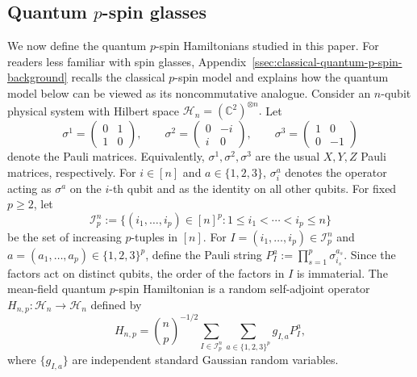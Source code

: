 \documentclass[12pt]{article}
\newcommand{\C}{\mathbb{C}}
\newcommand{\mcH}{\mathcal{H}}
\newcommand{\mcI}{\mathcal{I}}
\begin{document}
\subsection{Quantum $p$-spin glasses}
We now define the quantum \(p\)-spin Hamiltonians studied in this paper. For readers less familiar with spin glasses, Appendix~\ref{ssec:classical-quantum-p-spin-background}
recalls the classical \(p\)-spin model and explains how the quantum model below can be viewed as its noncommutative analogue.
Consider an \(n\)-qubit physical system with Hilbert space 
$\mcH_n=(\C^2)^{\otimes n}.$ Let
\[
    \sigma^1
    =
    \begin{pmatrix}
        0&1\\
        1&0
    \end{pmatrix},
    \qquad
    \sigma^2
    =
    \begin{pmatrix}
        0&-i\\
        i&0
    \end{pmatrix},
    \qquad
    \sigma^3
    =
    \begin{pmatrix}
        1&0\\
        0&-1
    \end{pmatrix}
\]
denote the Pauli matrices. Equivalently, \(\sigma^1,\sigma^2,\sigma^3\) are the usual \(X,Y,Z\) Pauli matrices, respectively. For \(i\in[n]\) and \(a\in\{1,2,3\}\), 
\(\sigma_i^a\) denotes the operator acting as \(\sigma^a\) on the \(i\)-th
qubit and as the identity on all other qubits. For fixed \(p\ge2\), let
\[
    \mcI_p^n
    :=
    \{(i_1,\dots,i_p)\in[n]^p:1\le i_1<\cdots<i_p\le n\}
\]
be the set of increasing $p$-tuples in \([n]\). For
\(I=(i_1,\dots,i_p)\in\mcI_p^n\) and
\(a=(a_1,\dots,a_p)\in\{1,2,3\}^p\), define the Pauli string $P_I^a
    :=
    \prod_{s=1}^p \sigma_{i_s}^{a_s}$.
Since the factors act on distinct qubits, the order of the factors in $I$ 
is immaterial. The mean-field quantum $p$-spin Hamiltonian is a 
random self-adjoint operator
\(H_{n,p}:\mcH_n\to\mcH_n\) defined by
\begin{equation}
\label{eq:mean-field-Hamiltonian}
H_{n,p}
=
\binom np^{-1/2}
\sum_{I\in\mcI_p^n}
\sum_{a\in\{1,2,3\}^p}
g_{I,a}P_I^a ,
\end{equation}
where  \(\{g_{I,a}\}\) are independent standard Gaussian
random variables.
\end{document}
